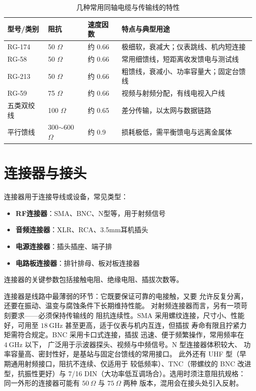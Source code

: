 \begin{table}[htbp]
\centering
\caption{几种常用同轴电缆与传输线的特性}
\begin{tabular}{|p{2.4cm}|p{2.0cm}|p{2.2cm}|p{4.2cm}|}
\hline
\textbf{型号/类别} & \textbf{阻抗} & \textbf{速度因数} & \textbf{特点与典型用途} \\
\hline
RG-174 & 50 $\Omega$ & 约 0.66 & 极细软，衰减大；仪表跳线、机内短连接 \\
\hline
RG-58 & 50 $\Omega$ & 约 0.66 & 常用细馈线，短距离收发馈电与测试线 \\
\hline
RG-213 & 50 $\Omega$ & 约 0.66 & 粗馈线，衰减小、功率容量大；固定台馈线 \\
\hline
RG-59 & 75 $\Omega$ & 约 0.66 & 视频与射频分配，有线电视入户线 \\
\hline
五类双绞线 & 100 $\Omega$ & 约 0.65 & 差分传输，以太网与数据链路 \\
\hline
平行馈线 & 300$\sim$600 $\Omega$ & 约 0.9 & 损耗极低，需平衡馈电与远离金属体 \\
\hline
\end{tabular}
\end{table}

\section{连接器与接头}
\label{sec:connectors}

连接器用于连接导线或设备，常见类型：

\begin{itemize}
    \item \textbf{RF连接器}：SMA、BNC、N型等，用于射频信号
    \item \textbf{音频连接器}：XLR、RCA、3.5mm耳机插头
    \item \textbf{电源连接器}：插头插座、端子排
    \item \textbf{电路板连接器}：排针排母、板对板连接器
\end{itemize}

连接器的关键参数包括接触电阻、绝缘电阻、插拔次数等。

连接器是线路中最薄弱的环节：它既要保证可靠的电接触，又要
允许反复分离，还要在振动、温变与腐蚀条件下长期维持性能。
对射频连接器而言，另有一项苛刻要求——必须保持传输线的
阻抗连续性。SMA 采用螺纹连接，尺寸小、性能好，可用至
$18\ \mathrm{GHz}$ 甚至更高，适于仪表与机内互连，但插拔
寿命有限且拧紧力矩需符合规定。BNC 采用卡口式连接，插拔
迅速、便于频繁操作，常用频率在 $4\ \mathrm{GHz}$ 以下，
广泛用于示波器探头、视频与中频信号。N 型连接器体积较大、
功率容量高、密封性好，是基站与固定台馈线的常用接口。
此外还有 UHF 型（早期通用射频接口，阻抗不连续、仅适用于
较低频率）、TNC（带螺纹的 BNC 改进型，抗振性更好）与
7/16 DIN（大功率低互调场合）。选用时须注意阻抗规格：
同一外形的连接器可能有 $50\ \Omega$ 与 $75\ \Omega$ 两种
版本，混用会在接头处引入反射。

